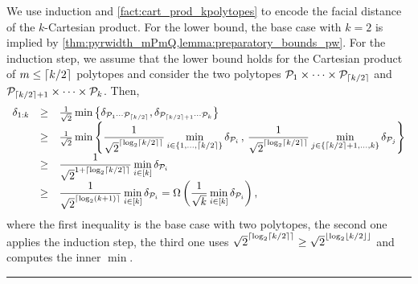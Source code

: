 \documentclass[twoside]{article}
\newcommand{\bigomegal}[1]{\Omega\left( #1 \right)}
\newcommand{\jmlrBlackBox}{\rule{1.5ex}{1.5ex}}
\newcommand{\jmlrQED}{\hfill\jmlrBlackBox\par\bigskip}
\providecommand{\proofname}{Proof}
\renewenvironment{proof}{\par\noindent{\bfseries\upshape \proofname\ }}{\jmlrQED}
\newcommand{\mP}{\mathcal{P}}
\DeclarePairedDelimiter\ceil{\lceil}{\rceil}
\DeclarePairedDelimiter\floor{\lfloor}{\rfloor}
\begin{document}
\begin{proof}
We use induction and \cref{fact:cart_prod_kpolytopes} %
to encode the facial distance of the $k$-Cartesian product.
For the lower bound, the base case with $k=2$ is implied by \cref{thm:pyrwidth_mPmQ,lemma:preparatory_bounds_pw}.
For the induction step, we assume that the lower bound holds for the Cartesian product of $m \le \ceil{k/2}$ polytopes and consider the two polytopes $\mP_1 \times \cdots \times \mP_{\ceil{k/2}}$ and $\mP_{\ceil{k/2}+1} \times \cdots \times \mP_k$. 
Then, 
\[
\begin{array}{rcl}
\pw{1:k} &\ge& \frac{1}{\sqrt{2}}\min\left\{\pw{\mP_1\cdots\mP_{\ceil{k/2}}}, \pw{\mP_{\ceil{k/2}+1}\cdots \mP_k}\right\}\\
%
&\ge&
%
\frac{1}{\sqrt{2}} \displaystyle\min \left\{
\frac{1}{\sqrt{2}^{\ceil{\log_2 \ceil{k/2}}}}\min_{i \in \left\{1, \dots, \ceil{k/2}\right\}} \pw{\mP_i}\,,\, 
%
\frac{1}{\sqrt{2}^{\ceil{\log_2 \ceil{k/2}}}}\min_{j \in \left\{\ceil{k/2}+1, \dots, k\right\}} \pw{\mP_j}
\right\}\\
%
&\ge&
\displaystyle \frac{1}{\sqrt{2}^{1 + \ceil{\log_2 \ceil{k/2}}}}
\min_{i \in [k]} \pw{\mP_i}\\
%
&\geq&
%
\displaystyle \frac{1}{\sqrt{2}^{\ceil{\log_2 (k+1)}}}
    \min_{i \in [k]} \pw{\mP_i} = \bigomegal{\frac{1}{\sqrt{k}} \min_{i \in [k]} \pw{\mP_i}},
\end{array}
\]
where the first inequality is the base case with two polytopes, the second one applies the induction step, the third one uses $\sqrt{2}^{\ceil{\log_2 \ceil{k/2}}} \ge \sqrt{2}^{\floor{\log_2 \floor{k/2}}}$ and computes the inner $\min$.

\end{proof}

\end{document}
